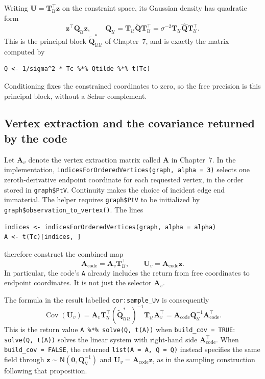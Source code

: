 \documentclass[11pt,a4paper]{article}
\theoremstyle{plain}
\theoremstyle{definition}
\begin{document}
Writing $\mathbf U=\mathbf T_{\mathcal U}^\top\mathbf z$ on the constraint
space, its Gaussian density has quadratic form
\begin{equation}
\mathbf z^\top\mathbf Q_{\mathcal U}\mathbf z,
\qquad
\mathbf Q_{\mathcal U}
=\mathbf T_{\mathcal U}\widetilde{\mathbf Q}
 \mathbf T_{\mathcal U}^\top
=\sigma^{-2}\mathbf T_{\mathcal U}\widehat{\mathbf Q}
 \mathbf T_{\mathcal U}^\top.
\end{equation}
This is the principal block
$\widetilde{\mathbf Q}^{*}_{\mathcal U\mathcal U}$ of Chapter~7, and is
exactly the matrix computed by
\begin{verbatim}
Q <- 1/sigma^2 * Tc %*% Qtilde %*% t(Tc)
\end{verbatim}
Conditioning fixes the constrained coordinates to zero, so the free
precision is this principal block, without a Schur complement.

\subsection{Vertex extraction and the covariance returned by the code}

Let $\mathbf A_v$ denote the vertex extraction matrix called
$\mathbf A$ in Chapter~7. In the implementation,
\texttt{indicesForOrderedVertices(graph, alpha = 3)} selects one
zeroth-derivative endpoint coordinate for each requested vertex, in the
order stored in \texttt{graph\$PtV}. Continuity makes the choice of
incident edge end immaterial. The helper requires \texttt{graph\$PtV}
to be initialized by \texttt{graph\$observation\_to\_vertex()}.
The lines
\begin{verbatim}
indices <- indicesForOrderedVertices(graph, alpha = alpha)
A <- t(Tc)[indices, ]
\end{verbatim}
therefore construct the combined map
\begin{equation}
\mathbf A_{\mathrm{code}}=\mathbf A_v\mathbf T_{\mathcal U}^\top,
\qquad \mathbf U_v=\mathbf A_{\mathrm{code}}\mathbf z.
\end{equation}
In particular, the code's \texttt{A} already includes the return from
free coordinates to endpoint coordinates. It is not just the selector
$\mathbf A_v$.

The formula in the result labelled \texttt{cor:sample\_Uv} is consequently
\begin{equation}
\boxed{\quad
\operatorname{Cov}(\mathbf U_v)
=\mathbf A_v\mathbf T_{\mathcal U}^\top
 \left(\widetilde{\mathbf Q}^{*}_{\mathcal U\mathcal U}\right)^{-1}
 \mathbf T_{\mathcal U}\mathbf A_v^\top
=\mathbf A_{\mathrm{code}}\mathbf Q_{\mathcal U}^{-1}
 \mathbf A_{\mathrm{code}}^\top.
\quad}
\label{eq:alpha3_sample_Uv_code}
\end{equation}
This is the return value \texttt{A \%*\% solve(Q, t(A))} when
\texttt{build\_cov = TRUE}: \texttt{solve(Q, t(A))} solves the linear
system with right-hand side $\mathbf A_{\mathrm{code}}^\top$.
When \texttt{build\_cov = FALSE}, the returned \texttt{list(A = A, Q = Q)}
instead specifies the same field through
$\mathbf z\sim\mathsf N(\mathbf0,\mathbf Q_{\mathcal U}^{-1})$ and
$\mathbf U_v=\mathbf A_{\mathrm{code}}\mathbf z$, as in the sampling
construction following that proposition.
\end{document}
